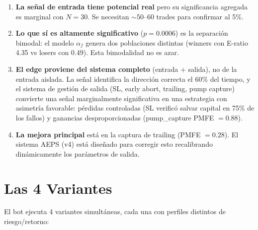 \documentclass[11pt,a4paper]{article}
\newcommand{\af}{\alpha_f}
\begin{document}
\begin{tcolorbox}[versionbox=cpurple, title=Veredicto]
\begin{enumerate}[leftmargin=1.5em]
\item \textbf{La se\~nal de entrada tiene potencial real} pero su
  significancia agregada es marginal con $N=30$. Se necesitan
  $\sim$50--60 trades para confirmar al 5\%.

\item \textbf{Lo que s\'i es altamente significativo} ($p = 0.0006$)
  es la separaci\'on bimodal: el modelo $\af$ genera dos poblaciones
  distintas (winners con E-ratio 4.35 vs losers con 0.49). Esta
  bimodalidad no es azar.

\item \textbf{El edge proviene del sistema completo} (entrada + salida),
  no de la entrada aislada. La se\~nal identifica la direcci\'on correcta
  el 60\% del tiempo, y el sistema de gesti\'on de salida (SL, early abort,
  trailing, pump capture) convierte una se\~nal marginalmente significativa
  en una estrategia con asimetr\'ia favorable: p\'erdidas controladas
  (SL verific\'o salvar capital en 75\% de los fallos) y ganancias
  desproporcionadas (pump\_capture PMFE $= 0.88$).

\item \textbf{La mejora principal} est\'a en la captura de trailing
  (PMFE $= 0.28$). El sistema AEPS (v4) est\'a dise\~nado para
  corregir esto recalibrando din\'amicamente los par\'ametros de salida.
\end{enumerate}
\end{tcolorbox}


\section{Las 4 Variantes}
\label{sec:variants}

El bot ejecuta 4 variantes simult\'aneas, cada una con perfiles distintos
de riesgo/retorno:
\end{document}
